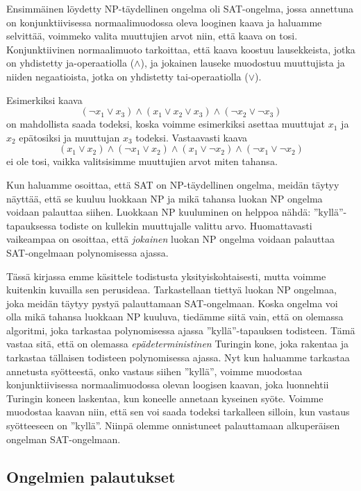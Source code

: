 Ensimmäinen löydetty NP-täydellinen ongelma oli
SAT-ongelma, jossa annettuna on konjunktiivisessa
normaalimuodossa oleva looginen kaava ja haluamme
selvittää, voimmeko valita muuttujien arvot niin,
että kaava on tosi.
Konjunktiivinen normaalimuoto tarkoittaa,
että kaava koostuu lausekkeista, jotka on yhdistetty
ja-operaatiolla ($\land$), ja jokainen lauseke muodostuu
muuttujista ja niiden negaatioista, jotka on yhdistetty
tai-operaatiolla ($\lor$).

Esimerkiksi kaava
\[(\neg x_1 \lor x_3) \land (x_1 \lor x_2 \lor x_3) \land (\neg x_2 \lor \neg x_3)\]
on mahdollista saada todeksi, koska voimme esimerkiksi asettaa
muuttujat $x_1$ ja $x_2$ epätosiksi ja muuttujan $x_3$ todeksi.
Vastaavasti kaava
\[(x_1 \lor x_2) \land (\neg x_1 \lor x_2) \land (x_1 \lor \neg x_2) \land (\neg x_1 \lor \neg x_2) \]
ei ole tosi, vaikka valitsisimme muuttujien arvot miten tahansa.

Kun haluamme osoittaa, että SAT on NP-täydellinen ongelma,
meidän täytyy näyttää, että se kuuluu luokkaan NP ja mikä
tahansa luokan NP ongelma voidaan palauttaa siihen.
Luokkaan NP kuuluminen on helppoa nähdä:
''kyllä''-tapauksessa todiste on kullekin muuttujalle valittu arvo.
Huomattavasti vaikeampaa on osoittaa, että \emph{jokainen} luokan
NP ongelma voidaan palauttaa SAT-ongelmaan polynomisessa ajassa.

Tässä kirjassa emme käsittele todistusta yksityiskohtaisesti,
mutta voimme kuitenkin kuvailla sen perusideaa.
Tarkastellaan tiettyä luokan NP ongelmaa,
joka meidän täytyy pystyä palauttamaan SAT-ongelmaan.
Koska ongelma voi olla mikä tahansa luokkaan NP kuuluva, tiedämme siitä vain,
että on olemassa algoritmi, joka tarkastaa
polynomisessa ajassa ''kyllä''-tapauksen todisteen.
Tämä vastaa sitä, että on olemassa \emph{epädeterministinen} Turingin kone,
joka rakentaa ja tarkastaa tällaisen todisteen polynomisessa ajassa.
Nyt kun haluamme tarkastaa annetusta syötteestä, onko vastaus siihen ''kyllä'',
voimme muodostaa konjunktiivisessa normaalimuodossa olevan loogisen kaavan,
joka luonnehtii Turingin koneen laskentaa, kun koneelle annetaan kyseinen syöte.
Voimme muodostaa kaavan niin, että sen voi saada todeksi tarkalleen silloin,
kun vastaus syötteeseen on ''kyllä''.
Niinpä olemme onnistuneet palauttamaan alkuperäisen ongelman SAT-ongelmaan.

\subsection{Ongelmien palautukset}

